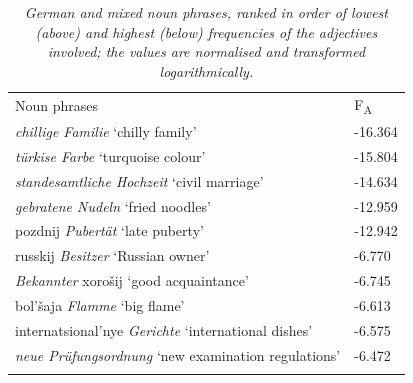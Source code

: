 \begin{table}
		{\begin{tabularx}{\textwidth}{XL{1.5cm}} 
			\midrule
			\addlinespace[2mm]
			Noun phrases	& F\textsubscript{A} \\ \addlinespace[2mm] \midrule
			\addlinespace[2mm]
			\textit{chillige Familie} `chilly family'	&-16.364\\
			\textit{türkise Farbe} `turquoise colour'	&-15.804\\
			\textit{standesamtliche Hochzeit}	`civil marriage'	&-14.634\\
			\textit{gebratene Nudeln} `fried noodles'	& -12.959\\
			pozdnij \textit{Pubertät} `late puberty' 	&-12.942 \\
			\addlinespace[2mm]
			\midrule
			\addlinespace[2mm]
			russkij \textit{Besitzer} `Russian owner'	& -6.770\\
			\textit{Bekannter} xorošij `good acquaintance'	&-6.745\\
			bol'šaja \textit{Flamme} `big flame'	&-6.613\\
			internatsional'nye \textit{Gerichte} `international dishes'	&-6.575\\
			\textit{neue Prüfungsordnung} `new examination regulations'		&-6.472\\
			\addlinespace[2mm]
			\midrule 
		\end{tabularx}}
\caption{\textit{German and mixed noun phrases, ranked in order of lowest (above) and highest (below) frequencies of the adjectives involved; the values are normalised and transformed logarithmically.}}\label{tab:4:4}
\end{table}


